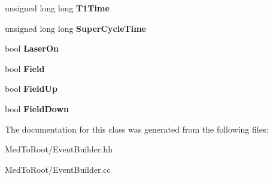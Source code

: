 \begin{DoxyCompactItemize}
unsigned long long {\bfseries T1\+Time}
\item 
\mbox{\label{class_event_builder_a3692a066973ab0e2efab7eeaab620886}} 
unsigned long long {\bfseries Super\+Cycle\+Time}
\item 
\mbox{\label{class_event_builder_a89b87c26a373bdaf01f473c835706422}} 
bool {\bfseries Laser\+On}
\item 
\mbox{\label{class_event_builder_a2b9e0006f22d5cb92c0eb383850a9724}} 
bool {\bfseries Field}
\item 
\mbox{\label{class_event_builder_a0bf9203feb4717fdb210ac451418b221}} 
bool {\bfseries Field\+Up}
\item 
\mbox{\label{class_event_builder_a5980c7ded97b54839b7dc8b0a807b72a}} 
bool {\bfseries Field\+Down}
\end{DoxyCompactItemize}


The documentation for this class was generated from the following files\+:\begin{DoxyCompactItemize}
\item 
Med\+To\+Root/Event\+Builder.\+hh\item 
Med\+To\+Root/Event\+Builder.\+cc\end{DoxyCompactItemize}
